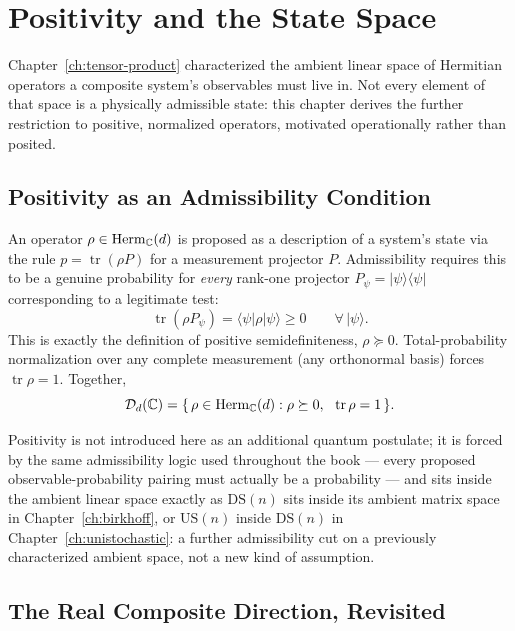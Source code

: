 \chapter{Positivity and the State Space}
\label{ch:positivity}

Chapter~\ref{ch:tensor-product} characterized the ambient linear space of
Hermitian operators a composite system's observables must live in. Not every
element of that space is a physically admissible state: this chapter derives
the further restriction to positive, normalized operators, motivated
operationally rather than posited.

\section{Positivity as an Admissibility Condition}

An operator $\rho \in \mathrm{Herm}_{\mathbb{C}}(d)$ is proposed as a description of a
system's state via the rule $p = \operatorname{tr}(\rho P)$ for a measurement
projector $P$. Admissibility requires this to be a genuine probability for
\emph{every} rank-one projector $P_\psi = |\psi\rangle\langle\psi|$
corresponding to a legitimate test:
\begin{equation}
\operatorname{tr}(\rho P_\psi) = \langle\psi|\rho|\psi\rangle \ge 0 \qquad
\forall\,|\psi\rangle.
\end{equation}
This is exactly the definition of positive semidefiniteness, $\rho \succeq 0$.
Total-probability normalization over any complete measurement (any orthonormal
basis) forces $\operatorname{tr}\rho = 1$. Together,
\begin{equation}
\mathcal D_d(\mathbb{C}) = \{\, \rho \in \mathrm{Herm}_{\mathbb{C}}(d) : \rho \succeq 0,\ \
\operatorname{tr}\rho = 1 \,\}.
\end{equation}

\begin{remark}
Positivity is not introduced here as an additional quantum postulate; it is
forced by the same admissibility logic used throughout the book — every
proposed observable-probability pairing must actually be a probability — and
sits inside the ambient linear space exactly as $\mathrm{DS}(n)$ sits inside
its ambient matrix space in Chapter~\ref{ch:birkhoff}, or $\mathrm{US}(n)$
inside $\mathrm{DS}(n)$ in Chapter~\ref{ch:unistochastic}: a further
admissibility cut on a previously characterized ambient space, not a new kind
of assumption.
\end{remark}

\section{The Real Composite Direction, Revisited}

